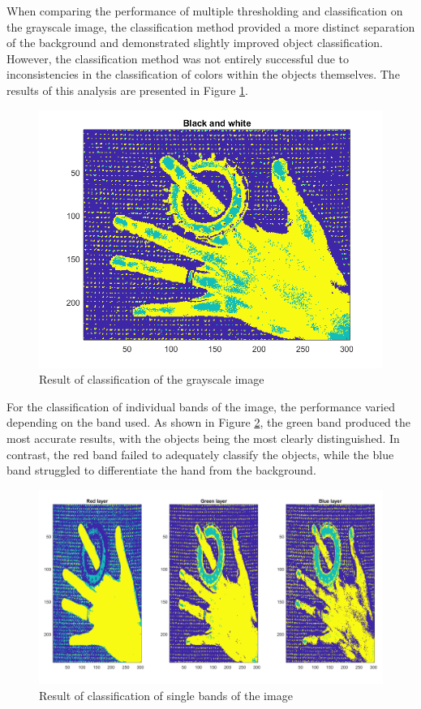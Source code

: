 \documentclass[12pt]{article}
\begin{document}
When comparing the performance of multiple thresholding and classification on the grayscale image, the classification method provided a more distinct separation of the background and demonstrated slightly improved object classification. However, the classification method was not entirely successful due to inconsistencies in the classification of colors within the objects themselves. The results of this analysis are presented in Figure \ref{fig:Q4_bw}.
\begin{figure}[htbp!]
  \centering
  \includegraphics[width = 15cm]{images/Q4_bw.png}
  \caption{Result of classification of the grayscale image}
  \label{fig:Q4_bw}
\end{figure}
For the classification of individual bands of the image, the performance varied depending on the band used. As shown in Figure \ref{fig:Q4_1}, the green band produced the most accurate results, with the objects being the most clearly distinguished. In contrast, the red band failed to adequately classify the objects, while the blue band struggled to differentiate the hand from the background.
\begin{figure}[htbp!]
  \centering
  \includegraphics[width =\textwidth]{images/Q4_1b.png}
  \caption{Result of classification of single bands of the image}
  \label{fig:Q4_1}
\end{figure}
\end{document}
